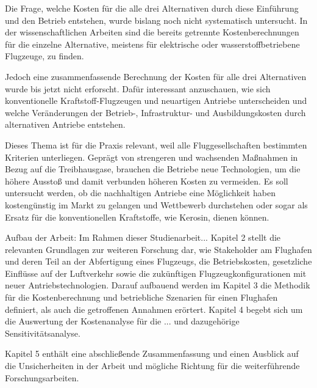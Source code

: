 Die Frage, welche Kosten für die alle drei Alternativen durch diese Einführung und den Betrieb entstehen, wurde bislang noch nicht systematisch
untersucht. In der wissenschaftlichen Arbeiten sind die bereits getrennte Kostenberechnungen für die einzelne Alternative, meistens für 
elektrische oder wasserstoffbetriebene Flugzeuge, zu finden.

Jedoch eine zusammenfassende Berechnung der Kosten für alle drei Alternativen wurde bis jetzt nicht erforscht.
Dafür interessant anzuschauen, wie sich konventionelle Kraftstoff-Flugzeugen und neuartigen Antriebe unterscheiden 
und welche Veränderungen der Betrieb-, Infrastruktur- und Ausbildungskosten durch alternativen Antriebe entstehen.

Dieses Thema ist für die Praxis relevant, weil alle Fluggesellschaften bestimmten Kriterien unterliegen. 
Geprägt von strengeren und wachsenden Maßnahmen in Bezug auf die Treibhausgase, brauchen die Betriebe neue Technologien, um die  
höhere  Ausstoß und damit verbunden höheren Kosten zu vermeiden.
Es soll untersucht werden, ob die nachhaltigen Antriebe eine Möglichkeit haben kostengünstig im Markt zu gelangen und Wettbewerb durchstehen oder 
sogar als Ersatz für die konventionellen Kraftstoffe, wie Kerosin, dienen können.

Aufbau der Arbeit: Im Rahmen dieser Studienarbeit...
Kapitel 2 stellt die relevanten Grundlagen zur weiteren Forschung dar, wie Stakeholder am Flughafen und deren Teil an der Abfertigung eines Flugzeugs,
die Betriebskosten, gesetzliche Einflüsse auf der Luftverkehr sowie die zukünftigen Flugzeugkonfigurationen mit neuer Antriebstechnologien.
Darauf aufbauend werden im Kapitel 3 die Methodik für die Kostenberechnung und betriebliche Szenarien für einen Flughafen definiert, 
als auch die getroffenen Annahmen erörtert.
Kapitel 4 begebt sich um die Auswertung der Kostenanalyse für die ... und dazugehörige Sensitivitätsanalyse.

Kapitel 5 enthält eine abschließende Zusammenfassung und einen Ausblick auf die Unsicherheiten in der Arbeit 
und mögliche Richtung für die weiterführende Forschungsarbeiten.


